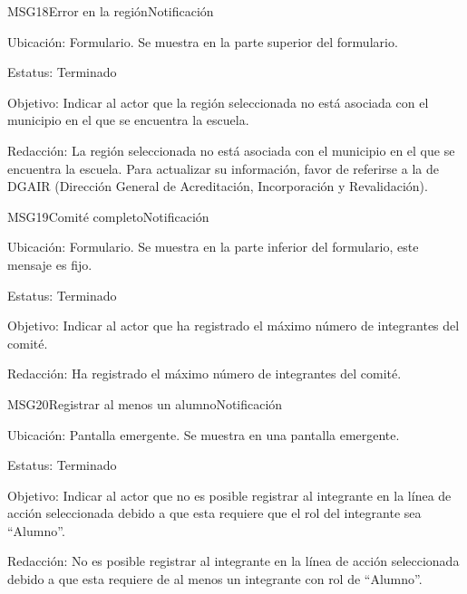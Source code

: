 \begin{mensaje}{MSG18}{Error en la región}{Notificación}
	\item[Ubicación:] Formulario. Se muestra en la parte superior del formulario.
	\item[Estatus:] Terminado
	\item[Objetivo:] Indicar al actor que la región seleccionada no está asociada con el municipio en el que se encuentra la escuela.
	\item[Redacción:] La región seleccionada no está asociada con el municipio en el que se encuentra la escuela. Para actualizar
		  su información, favor de referirse a la de DGAIR (Dirección General de Acreditación, Incorporación y Revalidación).
\end{mensaje}

\begin{mensaje}{MSG19}{Comité completo}{Notificación}
    \item[Ubicación:] Formulario. Se muestra en la parte inferior del formulario, este mensaje es fijo.
    \item[Estatus:] Terminado
    \item[Objetivo:] Indicar al actor que ha registrado el máximo número de integrantes del comité.
    \item[Redacción:] Ha registrado el máximo número de integrantes del comité.
\end{mensaje}

\begin{mensaje}{MSG20}{Registrar al menos un alumno}{Notificación}
    \item[Ubicación:] Pantalla emergente. Se muestra en una pantalla emergente.
    \item[Estatus:] Terminado
    \item[Objetivo:] Indicar al actor que no es posible registrar al integrante en la línea de acción seleccionada debido a que esta
	  requiere que el rol del integrante sea ``Alumno''.		      
    \item[Redacción:] No es posible registrar al integrante en la línea de acción seleccionada debido a que esta requiere de al menos un integrante
	  con rol de ``Alumno''.
\end{mensaje}

